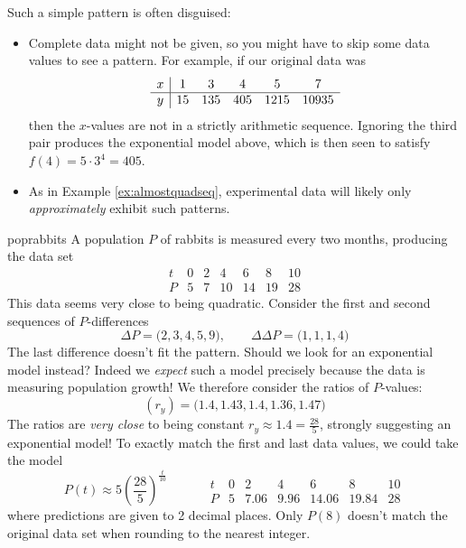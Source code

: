 Such a simple pattern is often disguised:
\begin{itemize}
  \item Complete data might not be given, so you might have to skip some data values to see a pattern. For example, if our original data was
  \[
  	\begin{array}[t]{c|ccccc}
			x&1&3&4&5&7\\\hline
			y&15&135&405&1215&10935
		\end{array}
	\]
	then the $x$-values are not in a strictly arithmetic sequence. Ignoring the third pair produces the exponential model above, which is then seen to satisfy $f(4)=5\cdot 3^4=405$. 
	\item As in Example \ref{ex:almostquadseq}, experimental data will likely only \emph{approximately} exhibit such patterns.
\end{itemize}



\begin{example}{}{poprabbits}
	A population $P$ of rabbits is measured every two months, producing the data set
	\[
		\begin{array}{c|cccccc}
			t&0&2&4&6&8&10\\\hline
			P&5&7&10&14&19&28
		\end{array}
	\]
	This data seems very close to being quadratic. Consider the first and second sequences of $P$-differences
	\[
		\Delta P=\big(2,3,4,5,9\big),\qquad \Delta\Delta P=\big(1,1,1,4\big)
	\]
	The last difference doesn't fit the pattern. Should we look for an exponential model instead? Indeed we \emph{expect} such a model precisely because the data is measuring population growth! We therefore consider the ratios of $P$-values:
	\[
		(r_y)=\big(1.4,1.43,1.4,1.36,1.47\big)
	\]
	The ratios are \emph{very close} to being constant $r_y\approx 1.4=\frac{28}5$, strongly suggesting an exponential model! To exactly match the first and last data values, we could take the model
	\[
		P(t)\approx 5\left(\frac{28}5\right)^{\frac t{10}}
		\qquad\quad
		\begin{array}{c|cccccc}
			t&0&2&4&6&8&10\\\hline
			P&5&7.06&9.96&14.06&19.84&28
		\end{array}
	\]
	where predictions are given to 2 decimal places. Only $P(8)$ doesn't match the original data set when rounding to the nearest integer.
\end{example}


